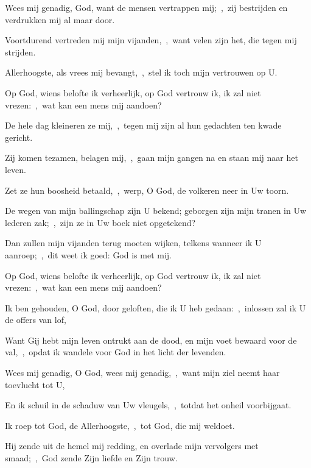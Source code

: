 \documentclass[12pt,twoside,a5paper]{article}
\begin{document}
\begin{halfparskip}

   Wees mij genadig, God, want de mensen vertrappen mij;~\sep\ zij bestrijden en verdrukken mij al maar door.


  Voortdurend vertreden mij mijn vijanden,~\sep\ want velen zijn het, die tegen mij strijden.

  Allerhoogste, als vrees mij bevangt,~\sep\ stel ik toch mijn vertrouwen op U.

  Op God, wiens belofte ik verheerlijk, op God vertrouw ik, ik zal niet vrezen:~\sep\ wat kan een mens mij aandoen?

  De hele dag kleineren ze mij,~\sep\ tegen mij zijn al hun gedachten ten kwade gericht.

  Zij komen tezamen, belagen mij,~\sep\ gaan mijn gangen na en staan mij naar het leven.

  Zet ze hun boosheid betaald,~\sep\ werp, O God, de volkeren neer in Uw toorn.

  De wegen van mijn ballingschap zijn U bekend; geborgen zijn mijn tranen in Uw lederen zak;~\sep\ zijn ze in Uw boek niet opgetekend?

  Dan zullen mijn vijanden terug moeten wijken, telkens wanneer ik U aanroep;~\sep\ dit weet ik goed: God is met mij.

  Op God, wiens belofte ik verheerlijk, op God vertrouw ik, ik zal niet vrezen:~\sep\ wat kan een mens mij aandoen?

  Ik ben gehouden, O God, door geloften, die ik U heb gedaan:~\sep\ inlossen zal ik U de offers van lof,

  Want Gij hebt mijn leven ontrukt aan de dood, en mijn voet bewaard voor de val,~\sep\ opdat ik wandele voor God in het licht der levenden.

   Wees mij genadig, O God, wees mij genadig,~\sep\ want mijn ziel neemt haar toevlucht tot U,

  En ik schuil in de schaduw van Uw vleugels,~\sep\ totdat het onheil voorbijgaat.

  Ik roep tot God, de Allerhoogste,~\sep\ tot God, die mij weldoet.

  Hij zende uit de hemel mij redding, en overlade mijn vervolgers met smaad;~\sep\ God zende Zijn liefde en Zijn trouw.


\end{halfparskip}
\end{document}
